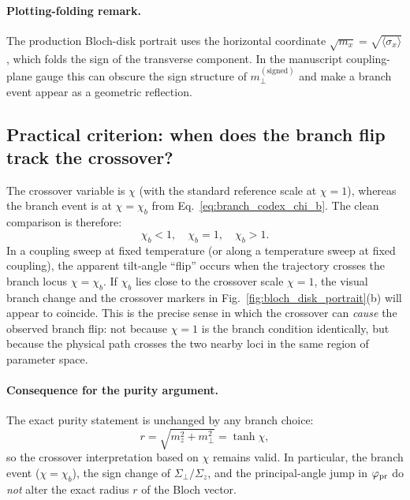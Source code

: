 \paragraph{Plotting-folding remark.}
The production Bloch-disk portrait uses the horizontal coordinate
$\sqrt{m_x}=\sqrt{\langle\sigma_x\rangle}$, which folds the sign of the
transverse component.  In the manuscript coupling-plane gauge this can obscure
the sign structure of $m_\perp^{(\mathrm{signed})}$ and make a branch event
appear as a geometric reflection.

\subsection{Practical criterion: when does the branch flip track the crossover?}

The crossover variable is $\chi$ (with the standard reference scale at
$\chi=1$), whereas the branch event is at $\chi=\chi_b$ from
Eq.~\eqref{eq:branch_codex_chi_b}.  The clean comparison is therefore:
\begin{equation}
    \chi_b < 1,\quad \chi_b = 1,\quad \chi_b > 1.
\end{equation}
In a coupling sweep at fixed temperature (or along a temperature sweep at fixed
coupling), the apparent tilt-angle ``flip'' occurs when the trajectory crosses
the branch locus $\chi=\chi_b$.  If $\chi_b$ lies close to the crossover scale
$\chi=1$, the visual branch change and the crossover markers in
Fig.~\ref{fig:bloch_disk_portrait}(b) will appear to coincide.  This is the
precise sense in which the crossover can \emph{cause} the observed branch flip:
not because $\chi=1$ is the branch condition identically, but because the
physical path crosses the two nearby loci in the same region of parameter
space.

\paragraph{Consequence for the purity argument.}
The exact purity statement is unchanged by any branch choice:
\begin{equation}
    r = \sqrt{m_z^2 + m_\perp^2} = \tanh\chi ,
    \label{eq:branch_codex_purity_branch_invariant}
\end{equation}
so the crossover interpretation based on $\chi$ remains valid.  In particular,
the branch event ($\chi=\chi_b$), the sign change of $\Sigma_\perp/\Sigma_z$,
and the principal-angle jump in $\varphi_{\rm pr}$ do \emph{not} alter the
exact radius $r$ of the Bloch vector.

